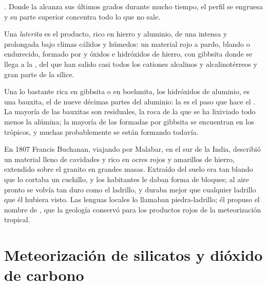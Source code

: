\emph{.} Donde la  alcanza sus últimos grados durante mucho tiempo, el perfil se engruesa y su parte superior concentra
todo lo que no sale.

\begin{definition}[Laterita]\label{def:b1:weathering-clays:laterite}
Una \emph{laterita} es el producto, rico en hierro y aluminio, de una  intensa y prolongada bajo climas cálidos y
húmedos: un material rojo a pardo, blando o endurecido, formado por  y óxidos e hidróxidos de hierro, con gibbsita donde se llega a
la , del que han salido casi todos los cationes alcalinos y alcalinotérreos y gran parte de la sílice.
\end{definition}

Una  lo bastante rica en gibbsita o en boehmita, los hidróxidos de aluminio, es una bauxita, el  de nueve décimas partes del
aluminio: la  es el paso que hace el . La mayoría de las bauxitas son residuales, la roca de la que se ha lixiviado todo menos
la alúmina; la mayoría de las formadas por gibbsita se encuentran en los trópicos, y muchas probablemente se están formando todavía.

\begin{history}
En 1807 Francis Buchanan, viajando por Malabar, en el sur de la India, describió un material lleno de cavidades y rico en ocres rojos y
amarillos de hierro, extendido sobre el granito en grandes masas. Extraído del suelo era tan blando que lo cortaba un cuchillo, y los habitantes
le daban forma de bloques; al aire pronto se volvía tan duro como el ladrillo, y duraba mejor que cualquier ladrillo que él hubiera visto. Las
lenguas locales lo llamaban piedra-ladrillo; él propuso el nombre de , que la geología conservó para los productos rojos de la
meteorización tropical.
\end{history}

\section{Meteorización de silicatos y dióxido de carbono}\label{sec:b1:weathering-clays:co2}


